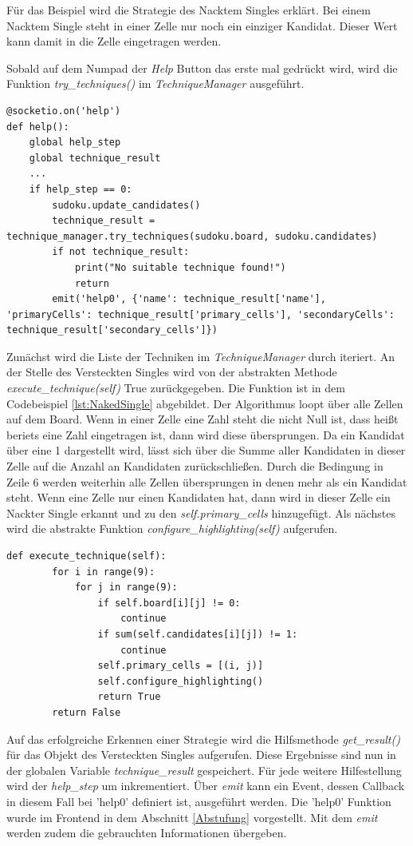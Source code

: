 Für das Beispiel wird die Strategie des Nacktem Singles erklärt. Bei einem Nacktem Single steht in einer Zelle nur noch ein einziger Kandidat. Dieser Wert kann damit in die Zelle eingetragen werden.

Sobald auf dem Numpad der \textit{Help} Button das erste mal gedrückt wird, wird die Funktion \textit{try\_techniques()} im \textit{TechniqueManager} ausgeführt. 
\begin{lstlisting}[caption={Serverseitig help}, label={lst:helper}]
@socketio.on('help')
def help():
	global help_step
	global technique_result
	...
	if help_step == 0:
		sudoku.update_candidates()
		technique_result = technique_manager.try_techniques(sudoku.board, sudoku.candidates)
		if not technique_result:
			print("No suitable technique found!")
			return
		emit('help0', {'name': technique_result['name'], 'primaryCells': technique_result['primary_cells'], 'secondaryCells': technique_result['secondary_cells']})
\end{lstlisting}

Zunächst wird die Liste der Techniken im \textit{TechniqueManager} durch iteriert. An der Stelle des Versteckten Singles wird von der abstrakten Methode \textit{execute\_technique(self)} True zurückgegeben. Die Funktion ist in dem Codebeispiel \ref{lst:NakedSingle} abgebildet. Der Algorithmus loopt über alle Zellen auf dem Board. Wenn in einer Zelle eine Zahl steht die nicht Null ist, dass heißt beriets eine Zahl eingetragen ist, dann wird diese übersprungen. Da ein Kandidat über eine 1 dargestellt wird, lässt sich über die Summe aller Kandidaten in dieser Zelle auf die Anzahl an Kandidaten zurückschließen. Durch die Bedingung in Zeile 6 werden weiterhin alle Zellen übersprungen in denen mehr als ein Kandidat steht. Wenn eine Zelle nur einen Kandidaten hat, dann wird in dieser Zelle ein Nackter Single erkannt und zu den \textit{self.primary\_cells} hinzugefügt. Als nächstes wird die abstrakte Funktion \textit{configure\_highlighting(self)} aufgerufen. 

\begin{lstlisting}[caption={Nackter Single}, label={lst:NakedSingle}]
	def execute_technique(self):
		for i in range(9):
			for j in range(9):
				if self.board[i][j] != 0:
					continue
				if sum(self.candidates[i][j]) != 1:
					continue
				self.primary_cells = [(i, j)]
				self.configure_highlighting()
				return True
		return False
\end{lstlisting}

Auf das erfolgreiche Erkennen einer Strategie wird die Hilfsmethode \textit{get\_result()} für das Objekt des Versteckten Singles aufgerufen. Diese Ergebnisse sind nun in der globalen Variable \textit{technique\_result} gespeichert. Für jede weitere Hilfestellung wird der \textit{help\_step} um inkrementiert. Über \textit{emit} kann ein Event, dessen Callback in diesem Fall bei 'help0' definiert ist, ausgeführt werden. Die 'help0' Funktion wurde im Frontend in dem Abschnitt \ref{Abstufung} vorgestellt. Mit dem \textit{emit} werden zudem die gebrauchten Informationen übergeben.

